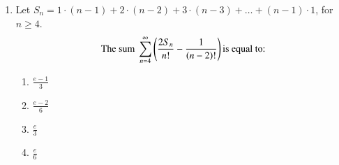 \documentclass[journal,12pt,onecolumn]{IEEEtran}
\theoremstyle{remark}
\begin{document}
\begin{enumerate}
\item Let $S_n = 1 \cdot (n-1) + 2 \cdot (n-2) + 3 \cdot (n-3) + \dots + (n-1) \cdot 1$, for $n \geq 4$.
\begin{align*} \text{The sum }
\sum_{n=4}^{\infty} \left(\frac{2S_n}{n!} - \frac{1}{\left(n-2\right)!}\right) \text{is equal to:}
\end{align*}
\begin{multicols}{2}
\begin{enumerate}
    \item $\frac{e-1}{3}$\\
    \item $\frac{e-2}{6}$
    \item $\frac{e}{3}$\\
    \item $\frac{e}{6}$
\end{enumerate}
\end{multicols}
\end{enumerate}
\end{document}
